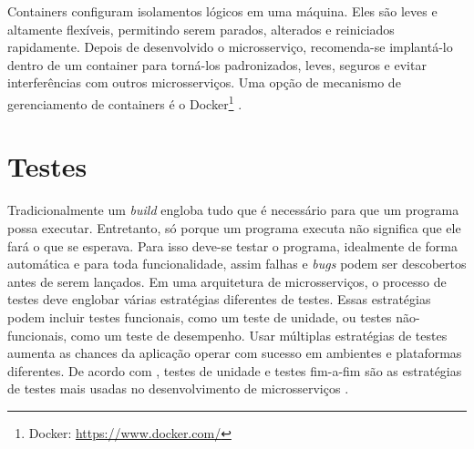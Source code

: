 Containers configuram isolamentos lógicos em uma máquina. Eles são leves e altamente flexíveis, permitindo serem parados, alterados e reiniciados rapidamente. Depois de desenvolvido o microsserviço, recomenda-se implantá-lo dentro de um container para torná-los padronizados, leves, seguros e evitar interferências com outros microsserviços. Uma opção de mecanismo de gerenciamento de containers é o Docker\footnote{Docker: \url{https://www.docker.com/}} \cite{oracle_microservices}.




\section{Testes}

Tradicionalmente um \emph{build} engloba tudo que é necessário para que um programa possa executar. Entretanto, só porque um programa executa não significa que ele fará o que se esperava. Para isso deve-se testar o programa, idealmente de forma automática e para toda funcionalidade, assim falhas e \emph{bugs} podem ser descobertos antes de serem lançados. Em uma arquitetura de microsserviços, o processo de testes deve englobar várias estratégias diferentes de testes. Essas estratégias podem incluir testes funcionais, como um teste de unidade, ou testes não-funcionais, como um teste de desempenho. Usar múltiplas estratégias de testes aumenta as chances da aplicação operar com sucesso em ambientes e plataformas diferentes. De acordo com , testes de unidade e testes fim-a-fim são as estratégias de testes mais usadas no desenvolvimento de microsserviços \cite{martin-fowler-continuous-integration,Familiar2015}.

